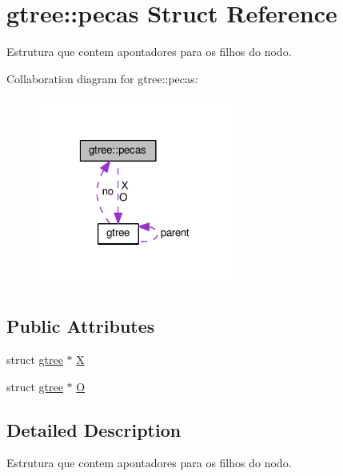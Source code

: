 \hypertarget{structgtree_1_1pecas}{\section{gtree\+:\+:pecas Struct Reference}
\label{structgtree_1_1pecas}
}


Estrutura que contem apontadores para os filhos do nodo.  




Collaboration diagram for gtree\+:\+:pecas\+:\nopagebreak
\begin{figure}[H]
\begin{center}
\leavevmode
\includegraphics[width=183pt]{structgtree_1_1pecas__coll__graph}
\end{center}
\end{figure}
\subsection*{Public Attributes}
\begin{DoxyCompactItemize}
\item 
struct \hyperlink{structgtree}{gtree} $\ast$ \hyperlink{structgtree_1_1pecas_a91807e036e47beeb03a1868267d9ae58}{X}
\item 
struct \hyperlink{structgtree}{gtree} $\ast$ \hyperlink{structgtree_1_1pecas_a7ca95b444632a7083c1a4ff3a79662a2}{O}
\end{DoxyCompactItemize}


\subsection{Detailed Description}
Estrutura que contem apontadores para os filhos do nodo. 

